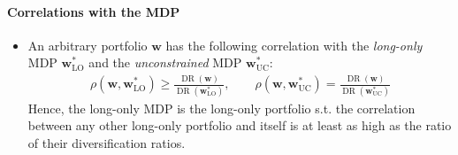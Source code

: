 \documentclass[a4paper,landscape,8pt,fleqn]{scrartcl}
\DeclareMathOperator{\DR}{DR}					%
\begin{document}
\begin{multicols*}{3}
\paragraph{Correlations with the MDP}
\begin{itemize}
\item An arbitrary portfolio $\bm w$ has the following correlation with the \textit{long-only} MDP $\bm w^\ast_\text{LO}$ and the \textit{unconstrained} MDP $\bm w^\ast_\text{UC}$:
\begin{align*}
\rho(\bm w, \bm w^\ast_\text{LO}) \geq \frac{\DR(\bm w)}{\DR(\bm w^\ast_\text{LO})}, \qquad
\rho(\bm w, \bm w^\ast_\text{UC}) = \frac{\DR(\bm w)}{\DR(\bm w^\ast_\text{UC})}
\end{align*}
Hence, the long-only MDP is the long-only portfolio s.t. the correlation between any other long-only portfolio and itself is at least as high as the ratio of their diversification ratios.
\end{itemize}


\end{multicols*}
\end{document}
